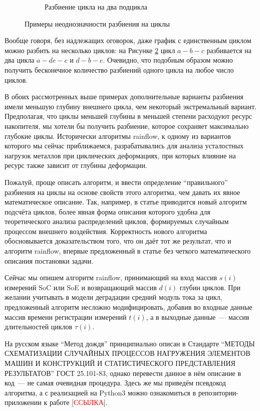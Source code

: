 \begin{enumerate}
\begin{figure}[]
\begin{subfigure}[b]{0.45\textwidth}
\caption{Разбиение цикла на два подцикла}
\label{fig:one-cycle}
\end{subfigure}
\caption{Примеры неоднозначности разбиения на циклы}
\end{figure}

Вообще говоря, без надлежащих оговорок, даже график с единственным циклом можно разбить на несколько циклов: на Рисунке \ref{fig:one-cycle} цикл $a-b-c$ разбивается на два цикла $a-de-c$ и $d-b-e$.
Очевидно, что подобным образом можно получить бесконечное количество разбиений одного цикла на любое число циклов.

В обоих рассмотренных выше примерах дополнительные варианты разбиения имели меньшую глубину внешнего цикла, чем некоторый экстремальный вариант.
Предполагая, что циклы меньшей глубины в меньшей степени расходуют ресурс накопителя, мы хотели бы получить разбиение, которое сохраняет максимально глубокие циклы.
Исторически алгоритмы rainflow, к одному из вариантов которого мы сейчас приближаемся, разрабатывались для анализа усталостных нагрузок металлов при циклических деформациях, при которых влияние на ресурс также зависит от глубины деформации.

Пожалуй, проще описать алгоритм, и ввести определение ``правильного'' разбиения на циклы на основе свойств этого алгоритма, чем давать их явное математическое описание.
Так, например, в статье \cite{rychlik1987new} приводится новый алгоритм подсчёта циклов, более явная форма описания которого удобна для теоретического анализа распределений циклов, формируемых случайным процессом внешнего воздействия.
Корректность нового алгоритма обосновывается доказательством того, что он даёт тот же результат, что и алгоритм rainflow, впервые предложенный в статье \cite{matsuishi1968fatigue} без четкого математического описания постановки задачи.

Сейчас мы опишем алгоритм rainflow, принимающий на вход массив $s(i)$ измерений SoC или SoE и возвращающий массив $d(i)$ глубин циклов.
При желании учитывать в модели деградации средний модуль тока за цикл, предложенный алгоритм несложно модифицировать, добавив во входные данные массив времени регистрации измерений $t(i)$, а в выходные данные~--- массив длительностей циклов $\tau(i)$.

На русском языке ``Метод дождя'' принципиально описан в Стандарте 
``МЕТОДЫ СХЕМАТИЗАЦИИ СЛУЧАЙНЫХ ПРОЦЕССОВ НАГРУЖЕНИЯ ЭЛЕМЕНТОВ МАШИН И КОНСТРУКЦИЙ И СТАТИСТИЧЕСКОГО ПРЕДСТАВЛЕНИЯ РЕЗУЛЬТАТОВ'' 
ГОСТ 25.101-83, однако перевести данное в нём описание в код~--- не самая очевидная процедура.
Здесь же мы приведём псевдокод алгоритма, а с реализацией на Python3 можно ознакомиться в репозитории-приложении к работе [\textcolor{red}{ССЫЛКА}].


\end{enumerate}
